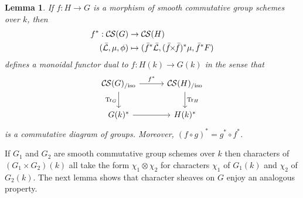 \documentclass[10pt]{amsart}
\theoremstyle{plain}
\newtheorem{lemma}[theorem]{Lemma}
\theoremstyle{definition}
\newcommand{\Fq}{k}
\newcommand{\Frob}[1]{\operatorname{Fr}_{#1}}
\newcommand{\iso}{{\ \cong\ }}
\newcommand{\TrFrob}[1]{\operatorname{Tr}_{#1}}
\newcommand{\cs}[1]{{\mathcal{#1}}}
\newcommand{\gcs}[1]{{\mathcal{\bar #1}}}
\newcommand{\CS}{{\mathcal{C\hskip-0.8pt S}}}
\newcommand{\CSiso}[1]{\CS(#1)_{/\text{iso}}}
\renewcommand{\bf}{\bar{f}}
\newcommand{\bm}{\bar{m}}
\newcommand{\tight}[3]{\hspace{-#1pt}{#2}\hspace{-#3pt}}
\newcommand{\bfxf}{\text{$\bar{f} \tight{1}{\times}{1} \bar{f}$}}
\newcommand{\GxxG}{\text{$G \tight{1}{\times}{1} G$}}
\newcommand{\LxL}{\text{$\gcs{L} \tight{0}{\boxtimes}{0} \gcs{L}$}}
\begin{document}
\begin{lemma}\label{lem:pullback}
  If $f : H\to G$ is a morphism of smooth commutative group schemes over $\Fq$, then
  \begin{align*}
  f^* : \CS(G) &\to \CS(H) \\
  (\gcs{L},\mu,\phi) &\mapsto (\bf^*\gcs{L},(\bfxf)^*\mu,\bf^*F)
  \end{align*}
  defines a monoidal functor dual to $f \colon H(\Fq) \to G(\Fq)$ in the sense that
  \[
  \begin{tikzcd}[row sep=20, column sep=30]
   \CSiso{G} \rar{f^*} \arrow[swap]{d}{\TrFrob{G}} & \CSiso{H} \dar{\TrFrob{H}} \\
   G(\Fq)^* \rar & H(\Fq)^*
  \end{tikzcd}
  \]
  is a commutative diagram of groups.  Moreover, $(f\circ g)^* = g^* \circ f^*$.
\end{lemma}
\iffalse
\begin{proof}
  Let $\cs{L}$ be a character sheaf on $G$. 
  Pullback by $\bf$ takes rank-one local systems to rank-one local systems.
  To see that $(\bfxf)^* \mu$ satisfies \ref{CS.2},
  apply the functor $(\bfxf)^*$
  to \ref{CS.2} for $\cs{L}$ and use the canonical isomorphism
  $(\bfxf)^*(\LxL) \iso \bf^*\gcs{L} \tight{-3}{\boxtimes}{-3} \bf^*\gcs{L}$.
  To show that $f^*\cs{L}$ satisfies
  \ref{CS.3}, apply the same functor to \ref{CS.3} for $\cs{L}$.
  Since $f$ is a morphism of group schemes defined over $\Fq$
  it provides isomorphisms $(\bfxf)^*\Frob{\GxxG}^* \iso \Frob{\GxxG}^* (\bfxf)^*$
  and $(\bfxf)^* \bm^*\iso \bm^* \bf^*$ between functors of constructible sheaves.

  Applying $\bf^*$ and $\bf^* \tight{1}{\times}{1}\bf^*$ to \ref{CS.4} defines the action
  of $f^*$ on morphisms of character sheaves; arguing as above shows that $f^*$ is
  a functor from $\CS(G)$ to $\CS(H)$.  Since tensor products commute with pullback in schemes,
  $f^* : \CS(G) \to \CS(H)$ is a monoidal functor.
  The diagram relating $f^* : \CS(G) \to \CS(H)$, $f^* : G(k)^* \to H(k)^*$ and trace of Frobenius
  commutes by \cite{laumon:87a}*{1.1.1.2}, where the ambient
 finite type hypothesis can be replaced by locally of finite type.

  Finally, the fact that $(f\circ g)^* = g^* \circ f^*$ follows from the analogous
  statements about the pullback functor on $\ell$-adic constructible sheaves.
\end{proof}
\fi

If $G_1$ and $G_2$ are smooth commutative group schemes over $\Fq$ then characters of $(G_1 \times G_2)(\Fq)$
all take the form $\chi_1\otimes \chi_2$ for characters $\chi_1$ of $G_1(\Fq)$ and $\chi_2$ of $G_2(\Fq)$. 
The next lemma shows that character sheaves on $G$ enjoy an analogous property.
\end{document}
